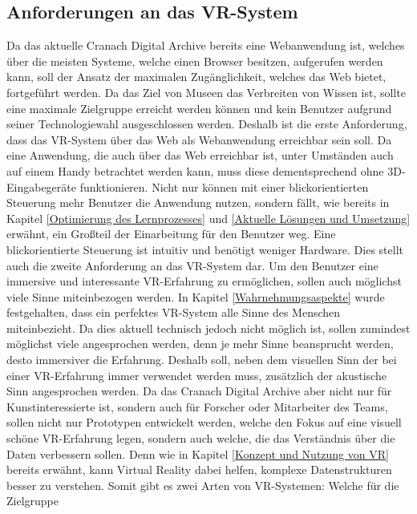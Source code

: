 \documentclass[a4paper,12pt,oneside]{article}
\begin{document}
    \subsection{Anforderungen an das VR-System}
      Da das aktuelle Cranach Digital Archive bereits eine Webanwendung ist, welches über
      die meisten Systeme, welche einen Browser besitzen, aufgerufen werden kann, soll
      der Ansatz der maximalen Zugänglichkeit, welches das Web bietet, fortgeführt werden.
      Da das Ziel von Museen das Verbreiten von Wissen ist, sollte eine maximale Zielgruppe
      erreicht werden können und kein Benutzer aufgrund seiner Technologiewahl 
      ausgeschlossen werden. Deshalb ist die erste Anforderung, dass das VR-System über
      das Web als Webanwendung erreichbar sein soll.
      Da eine Anwendung, die auch über das Web erreichbar ist, unter Umständen auch auf
      einem Handy betrachtet werden kann, muss diese dementsprechend ohne 3D-Eingabegeräte
      funktionieren. Nicht nur können mit einer blickorientierten Steuerung mehr Benutzer
      die Anwendung nutzen, sondern fällt, wie bereits in Kapitel \ref{Optimierung des Lernprozesses}
      und \ref{Aktuelle Lösungen und Umsetzung} erwähnt, ein Großteil der Einarbeitung für
      den Benutzer weg. Eine blickorientierte Steuerung ist intuitiv und benötigt weniger
      Hardware. Dies stellt auch die zweite Anforderung an das VR-System dar.
      Um den Benutzer eine immersive und interessante VR-Erfahrung zu ermöglichen, sollen
      auch möglichst viele Sinne miteinbezogen werden. In Kapitel \ref{Wahrnehmungsaspekte}
      wurde festgehalten, dass ein perfektes VR-System alle Sinne des Menschen miteinbezieht.
      Da dies aktuell technisch jedoch nicht möglich ist, sollen zumindest möglichst viele
      angesprochen werden, denn je mehr Sinne beansprucht werden, desto immersiver die 
      Erfahrung. Deshalb soll, neben dem visuellen Sinn der bei einer VR-Erfahrung immer
      verwendet werden muss, zusätzlich der akustische Sinn angesprochen werden.
      Da das Cranach Digital Archive aber nicht nur für Kunstinteressierte ist, sondern
      auch für Forscher oder Mitarbeiter des Teams, sollen nicht nur Prototypen entwickelt
      werden, welche den Fokus auf eine visuell schöne VR-Erfahrung legen, sondern auch welche,
      die das Verständnis über die Daten verbessern sollen. Denn wie in Kapitel \ref{Konzept und Nutzung von VR}
      bereits erwähnt, kann Virtual Reality dabei helfen, komplexe Datenstrukturen besser
      zu verstehen. Somit gibt es zwei Arten von VR-Systemen: Welche für die Zielgruppe
\end{document}
